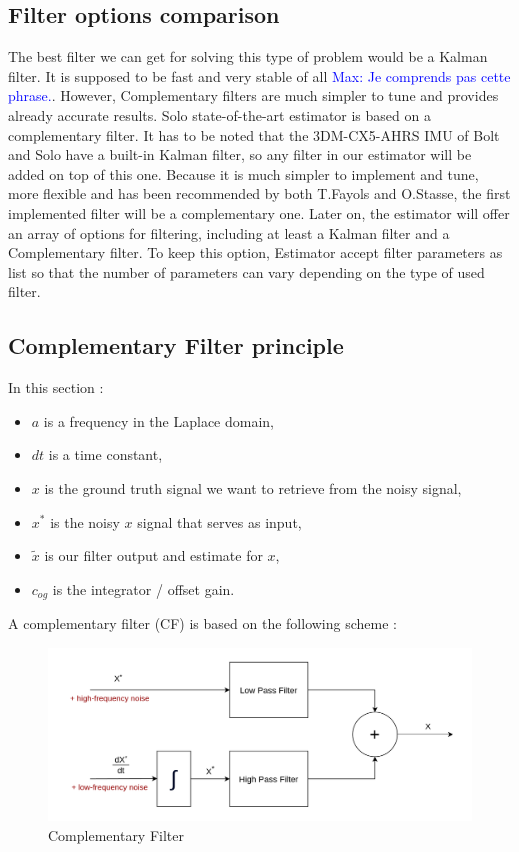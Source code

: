 \documentclass[a4paper,10pt]{article}
\newcommand{\mnaveau}[1]{\textcolor{blue}{Max: #1}}
\begin{document}
\subsection{Filter options comparison}

The best filter we can get for solving this type of problem would be a Kalman filter. It is supposed to be fast and very stable of all \mnaveau{Je comprends pas cette phrase.}. However, Complementary filters are much simpler to tune and provides already accurate results. Solo state-of-the-art estimator is based on a complementary filter. It has to be noted that the 3DM-CX5-AHRS IMU of Bolt and Solo have a built-in Kalman filter, so any filter in our estimator will be added on top of this one. Because it is much simpler to implement and tune, more flexible and has been recommended by both T.Fayols and O.Stasse, the first implemented filter will be a complementary one. Later on, the estimator will offer an array of options for filtering, including at least a Kalman filter and a Complementary filter. To keep this option, Estimator accept filter parameters as list so that the number of parameters can vary depending on the type of used filter.

\subsection{Complementary Filter principle}
\label{complementary filter principle}
In this section :
\begin{itemize}[noitemsep,topsep=0.5pt,parsep=0.1pt,partopsep=0.1pt]
\item $a$ is a frequency in the Laplace domain,
\item $dt$ is a time constant,
\item $x$ is the ground truth signal we want to retrieve from the noisy signal,
\item $x^*$ is the noisy $x$ signal that serves as input,
\item $\widetilde{x}$ is our filter output and estimate for $x$,
\item $c_{og}$ is the integrator / offset gain.

\end{itemize}
A complementary filter (CF) is based on the following scheme \cite{13}:
\begin{figure}[H]
\centering
  \includegraphics[width=\linewidth, angle=0, scale=0.8]{./images/CF*.png}
  \caption{Complementary Filter}
\end{figure}
\end{document}
